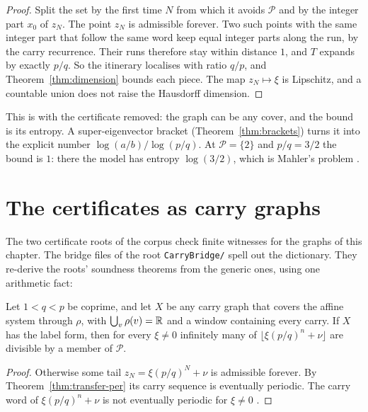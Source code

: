 \begin{proof}
Split the set by the first time \(N\) from which it avoids \(\mathcal P\) and by the integer
part \(x_0\) of \(z_N\). The point \(z_N\) is admissible forever. Two such points with the same
integer part that follow the same word keep equal integer parts along the run, by the carry
recurrence. Their runs therefore stay within distance \(1\), and \(T\) expands by exactly
\(p/q\). So the itinerary localises with ratio \(q/p\), and Theorem~\ref{thm:dimension} bounds
each piece. The map \(z_N\mapsto\xi\) is Lipschitz, and a countable union does not raise the
Hausdorff dimension.
\end{proof}

This is  with the certificate removed: the graph
can be any cover, and the bound is its entropy. A super-eigenvector bracket
(Theorem~\ref{thm:brackets}) turns it into the explicit number \(\log(a/b)/\log(p/q)\). At
\(\mathcal P=\{2\}\) and \(p/q=3/2\) the bound is \(1\): there the model has entropy
\(\log(3/2)\), which is Mahler's problem \cite{Mah68}.

\section{The certificates as carry graphs}\label{sec:cert-bridges}

The two certificate roots of the corpus check finite witnesses for the graphs of this chapter.
The bridge files of the root \texttt{CarryBridge/} spell out the dictionary. They re-derive the roots' soundness theorems from the generic ones, using one
arithmetic fact:

\begin{theorem}\label{thm:divisor-any-cover}
Let \(1<q<p\) be coprime, and let \(X\) be any carry graph that covers the affine system through
\(\rho\), with \(\bigcup_v\rho(v)=\mathbb{R}\) and a window containing every carry. If \(X\) has the
label form, then for every \(\xi\ne0\) infinitely many of \(\lfloor\xi(p/q)^n+\nu\rfloor\) are
divisible by a member of \(\mathcal P\).
\end{theorem}

\begin{proof}
Otherwise some tail \(z_N=\xi(p/q)^N+\nu\) is admissible forever. By
Theorem~\ref{thm:transfer-per} its carry sequence is eventually periodic. The carry word of
\(\xi(p/q)^n+\nu\) is not eventually periodic for \(\xi\ne0\) \cite[Lemma~2]{DN05}.
\end{proof}

